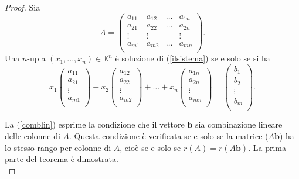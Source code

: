 \documentclass{article}
\theoremstyle{plain}
\theoremstyle{definition}
\theoremstyle{remark}
\begin{document}
\begin{proof}
    Sia 
    \[A=\begin{pmatrix}
        a_{11}&a_{12}&\dots&a_{1n}\\
        a_{21}&a_{22}&\dots&a_{2n}\\
        \vdots&\vdots&&\vdots\\
        a_{m1}&a_{m2}&\dots&a_{mn}\\
    \end{pmatrix}.\]
    Una $n$-upla $(x_1,...,x_n)\in\mathbb{K}^n$ è soluzione di (\ref{ilsistema}) se e solo se si ha 
    \begin{equation}\label{comblin}
        x_1\begin{pmatrix}
            a_{11}\\
            a_{21}\\
            \vdots\\
            a_{m1}\\
        \end{pmatrix}+
        x_2\begin{pmatrix}
            a_{12}\\
            a_{22}\\
            \vdots\\
            a_{m2}\\
        \end{pmatrix}+\dots+
        x_n\begin{pmatrix}
            a_{1n}\\
            a_{2n}\\
            \vdots\\
            a_{mn}\\
        \end{pmatrix}=
        \begin{pmatrix}
            b_{1}\\
            b_{2}\\
            \vdots\\
            b_{m}\\
        \end{pmatrix}.
    \end{equation}

    La (\ref{comblin}) esprime la condizione che il vettore $\mathbf{b}$ sia combinazione lineare delle colonne di $A$.
    Questa condizione è verificata se e solo se la matrice ($A\mathbf{b}$) ha lo stesso rango per colonne di $A$, cioè se e solo se $r(A)=r(A\mathbf{b})$.
    La prima parte del teorema è dimostrata.\\
     

\end{proof}
\end{document}
